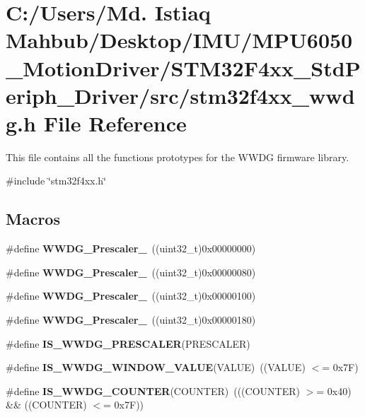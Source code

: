 \section{C\+:/\+Users/\+Md. Istiaq Mahbub/\+Desktop/\+I\+M\+U/\+M\+P\+U6050\+\_\+\+Motion\+Driver/\+S\+T\+M32\+F4xx\+\_\+\+Std\+Periph\+\_\+\+Driver/src/stm32f4xx\+\_\+wwdg.h File Reference}
\label{stm32f4xx__wwdg_8h}


This file contains all the functions prototypes for the W\+W\+DG firmware library.  


{\ttfamily \#include \char`\"{}stm32f4xx.\+h\char`\"{}}\newline
\subsection*{Macros}
\begin{DoxyCompactItemize}
\item 
\#define \textbf{ W\+W\+D\+G\+\_\+\+Prescaler\+\_}~((uint32\+\_\+t)0x00000000)
\item 
\#define \textbf{ W\+W\+D\+G\+\_\+\+Prescaler\+\_}~((uint32\+\_\+t)0x00000080)
\item 
\#define \textbf{ W\+W\+D\+G\+\_\+\+Prescaler\+\_}~((uint32\+\_\+t)0x00000100)
\item 
\#define \textbf{ W\+W\+D\+G\+\_\+\+Prescaler\+\_}~((uint32\+\_\+t)0x00000180)
\item 
\#define \textbf{ I\+S\+\_\+\+W\+W\+D\+G\+\_\+\+P\+R\+E\+S\+C\+A\+L\+ER}(P\+R\+E\+S\+C\+A\+L\+ER)
\item 
\#define \textbf{ I\+S\+\_\+\+W\+W\+D\+G\+\_\+\+W\+I\+N\+D\+O\+W\+\_\+\+V\+A\+L\+UE}(V\+A\+L\+UE)~((V\+A\+L\+UE) $<$= 0x7\+F)
\item 
\#define \textbf{ I\+S\+\_\+\+W\+W\+D\+G\+\_\+\+C\+O\+U\+N\+T\+ER}(C\+O\+U\+N\+T\+ER)~(((C\+O\+U\+N\+T\+ER) $>$= 0x40) \&\& ((\+C\+O\+U\+N\+T\+E\+R) $<$= 0x7\+F))
\end{DoxyCompactItemize}
